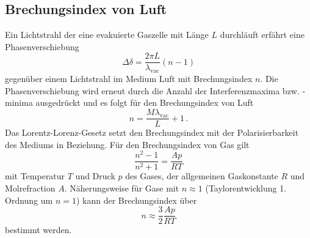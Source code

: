 \subsection{Brechungsindex von Luft}
Ein Lichtstrahl der eine evakuierte Gaszelle mit Länge $L$ durchläuft erfährt eine Phasenverschiebung
\begin{equation*}
    \Delta \delta =  \frac{2 \pi L}{\lambda_\text{vac}} (n-1)
\end{equation*}
gegenüber einem Lichtstrahl im Medium Luft mit Brechungsindex $n$.
Die Phasenverschiebung wird erneut durch die Anzahl der Interferenzmaxima bzw. -minima ausgedrückt und es folgt für den Brechungsindex von Luft
\begin{equation}
    n = \frac{M \lambda_\text{vac}}{L} + 1 \, .
    \label{eq:n_luft}
\end{equation}
Das Lorentz-Lorenz-Gesetz setzt den Brechungsindex mit der Polarisierbarkeit des Mediums in Beziehung.
Für den Brechungsindex von Gas gilt
\begin{equation*}
    \frac{n^2-1}{n^2+1} = \frac{A p}{R T}
\end{equation*}
mit Temperatur $T$ und Druck $p$ des Gases, der allgemeinen Gaskonstante $R$ und Molrefraction $A$.
Näherungsweise für Gase mit $n \approx 1$ (Taylorentwicklung 1. Ordnung um $n=1$) kann der Brechungsindex über
\begin{equation}
    n \approx \frac{3}{2} \frac{A p}{R T}
    \label{eq:n_luft_lorentz}
\end{equation}
bestimmt werden.